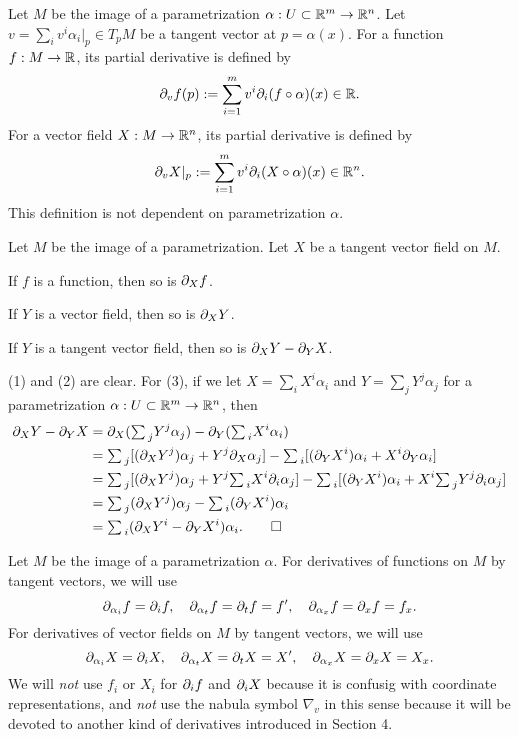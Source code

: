\documentclass{../note}
\def\a{\alpha}
\def\ssum{{\textstyle\sum\,}}
\begin{document}
\begin{defn}
Let $M$ be the image of a parametrization $\a:U\subset\R^m\to\R^n$.
Let $v=\sum_iv^i\a_i|_p\in T_pM$ be a tangent vector at $p=\a(x)$.
For a function $f:M\to\mathbb{R}$, its partial derivative is defined by
\[\pd_vf(p):=\sum_{i=1}^mv^i\pd_i(f\circ\a)(x)\in\R.\]
For a vector field $X:M\to\mathbb{R}^n$, its partial derivative is defined by
\[\pd_vX|_p:=\sum_{i=1}^mv^i\pd_i(X\circ\a)(x)\in\R^n.\]
This definition is not dependent on parametrization $\a$.
\end{defn}

\begin{prop}
Let $M$ be the image of a parametrization.
Let $X$ be a tangent vector field on $M$.
\begin{parts}
\item If $f$ is a function, then so is $\pd_Xf$.
\item If $Y$ is a vector field, then so is $\pd_XY$.
\item If $Y$ is a tangent vector field, then so is $\pd_XY-\pd_YX$.
\end{parts}
\end{prop}
\begin{pf}
(1) and (2) are clear.
For (3), if we let $X=\sum_iX^i\a_i$ and $Y=\sum_jY^j\a_j$ for a parametrization $\a:U\subset\R^m\to\R^n$, then
\begin{align*}
\pd_XY-\pd_YX
&=\pd_X(\ssum_jY^j\a_j)-\pd_Y(\ssum_iX^i\a_i)\\
&=\ssum_j[(\pd_XY^j)\a_j+Y^j\pd_X\a_j]-\ssum_i[(\pd_YX^i)\a_i+X^i\pd_Y\a_i]\\
&=\ssum_j[(\pd_XY^j)\a_j+Y^j\ssum_iX^i\pd_i\a_j]-\ssum_i[(\pd_YX^i)\a_i+X^i\ssum_jY^j\pd_i\a_j]\\
&=\ssum_j(\pd_XY^j)\a_j-\ssum_i(\pd_YX^i)\a_i\\
&=\ssum_i(\pd_XY^i-\pd_YX^i)\a_i.\qedhere
\end{align*}
\end{pf}

\begin{notn*}
Let $M$ be the image of a parametrization $\a$.
For derivatives of functions on $M$ by tangent vectors, we will use
\[\pd_{\a_i}f=\pd_if,\quad\pd_{\a_t}f=\pd_tf=f',\quad\pd_{\a_x}f=\pd_xf=f_x.\]
For derivatives of vector fields on $M$ by tangent vectors, we will use
\[\pd_{\a_i}X=\pd_iX,\quad\pd_{\a_t}X=\pd_tX=X',\quad\pd_{\a_x}X=\pd_xX=X_x.\]
We will \emph{not} use $f_i$ or $X_i$ for $\pd_if$ and $\pd_iX$ because it is confusig with coordinate representations, and \emph{not} use the nabula symbol $\nabla_v$ in this sense because it will be devoted to another kind of derivatives introduced in Section 4.
\end{notn*}
\end{document}
